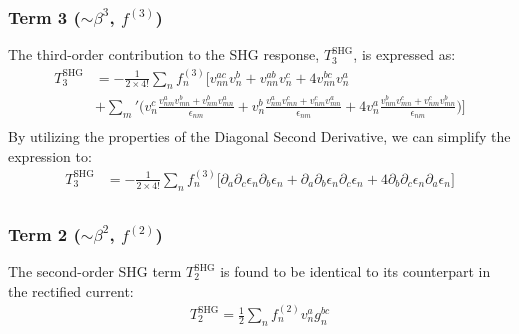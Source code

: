 \documentclass[twocolumn, prx, reprint, amsfonts, amsmath, amssymb, longbibliography, floatfix, aps]{revtex4-2}
\begin{document}
\subsubsection*{Term 3 (\texorpdfstring{$\sim \beta^3$}{beta3}, \texorpdfstring{$f^{(3)}$}{f3})}
The third-order contribution to the SHG response, $T^{\text{SHG}}_3$, is expressed as:
\begin{equation}
	\begin{aligned}
		T^{\text{SHG}}_3 &= -\frac{1}{2 \times 4!} {\textstyle \sum_{n}} f^{(3)}_n \Big[v^{ac}_{nn} v^b_{n} + v^{ab}_{nn}v^c_{n} + 4v^{bc}_{nn}v^a_{n} \\
		&  + {\textstyle \sum_{m}'}\Big(v^c_{n}\frac{v^a_{nm}v^b_{mn} + v^b_{nm}v^a_{mn}}{\epsilon_{nm}} + v^b_{n}\frac{v^a_{nm}v^c_{mn} + v^c_{nm}v^a_{mn}}{\epsilon_{nm}} + 4v^a_{n}\frac{v^b_{nm}v^c_{mn} + v^c_{nm}v^b_{mn}}{\epsilon_{nm}}\Big)\Big] \\
	\end{aligned}
\end{equation}
By utilizing the properties of the Diagonal Second Derivative, we can simplify the expression to:
\begin{equation}
	\begin{aligned}
		T^{\text{SHG}}_3 
		&= -\frac{1}{2 \times 4!} {\textstyle \sum_{n}} f^{(3)}_n \Big[\partial_a\partial_c \epsilon_n \partial_b \epsilon_n + \partial_a\partial_b \epsilon_n \partial_c \epsilon_n + 4\partial_b\partial_c \epsilon_n \partial_a \epsilon_n\Big] \\
	\end{aligned}
\end{equation}

\subsubsection*{Term 2 (\texorpdfstring{$\sim \beta^2$}{beta2}, \texorpdfstring{$f^{(2)}$}{f2})}
The second-order SHG term $T^{\text{SHG}}_2$ is found to be identical to its counterpart in the rectified current:
\begin{equation}
	\begin{aligned}
		T^{\text{SHG}}_2 = \frac{1}{2}{\textstyle \sum_{n}} f^{(2)}_n v^{a}_ng^{bc}_n
	\end{aligned}
\end{equation}
\end{document}
